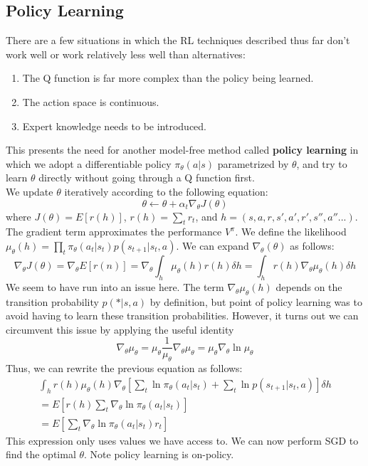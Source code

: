 \subsection{Policy Learning}
There are a few situations in which the RL techniques described thus far don't work well or work relatively less well than alternatives:
\begin{enumerate}
    \item The Q function is far more complex than the policy being learned.
    \item The action space is continuous.
    \item Expert knowledge needs to be introduced.
\end{enumerate}
This presents the need for another model-free method called \textbf{policy learning} in which we adopt a differentiable policy $\pi_\theta(a|s)$ parametrized by $\theta$, and try to learn $\theta$ directly without going through a Q function first.\\
We update $\theta$ iteratively according to the following equation:
\begin{equation*}
    \theta \leftarrow \theta + \alpha_t \nabla_\theta J(\theta)
\end{equation*}
where $J(\theta) = E[r(h)]$, $r(h) = \sum_tr_t$, and $h = (s, a, r, s', a', r', s'', a''...)$. The gradient term approximates the performance $V^{\pi}$. We define the likelihood $\mu_\theta(h) = \prod_t\pi_\theta(a_t|s_t)p(s_{t+1}|s_t, a)$. We can expand $\nabla_\theta(\theta)$ as follows:
\begin{equation}
    \nabla_\theta J(\theta) = \nabla_\theta E[r(n)] = \nabla_\theta\int_h\mu_\theta(h)r(h)\delta h = \int_hr(h)\nabla_\theta\mu_\theta(h)\delta h
\end{equation}
We seem to have run into an issue here. The term $\nabla_\theta\mu_\theta(h)$ depends on the transition probability $p(*|s, a)$ by definition, but point of policy learning was to avoid having to learn these transition probabilities. However, it turns out we can circumvent this issue by applying the useful identity
\begin{equation}
    \nabla_\theta\mu_\theta = \mu_\theta\frac{1}{\mu_\theta}\nabla_\theta\mu_\theta = \mu_\theta\nabla_\theta\ln\mu_\theta
\end{equation}
Thus, we can rewrite the previous equation as follows:
\begin{align}
    \int_hr(h)\mu_\theta(h)\nabla_\theta\left[\sum_t\ln\pi_\theta(a_t|s_t) + \sum_t\ln p(s_{t+1}|s_t, a)\right]\delta h\\
    = E\left[r(h)\sum_t\nabla_\theta\ln\pi_\theta(a_t|s_t)\right]\\
    = E\left[\sum_t\nabla_\theta\ln\pi_\theta(a_t|s_t)r_t\right]
\end{align}
This expression only uses values we have access to. We can now perform SGD to find the optimal $\theta$. Note policy learning is on-policy.
